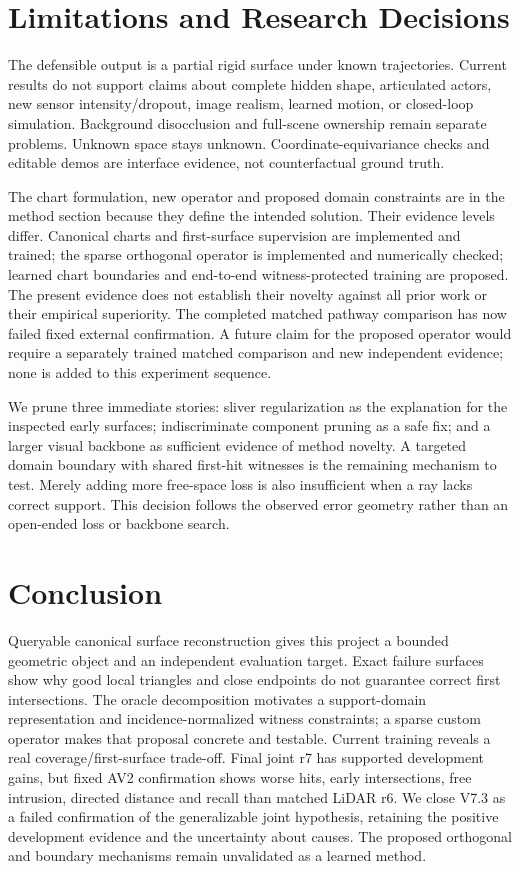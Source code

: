 \section{Limitations and Research Decisions}
\label{sec:limits}
The defensible output is a partial rigid surface under known trajectories. Current results do not support claims about complete hidden shape, articulated actors, new sensor intensity/dropout, image realism, learned motion, or closed-loop simulation. Background disocclusion and full-scene ownership remain separate problems. Unknown space stays unknown. Coordinate-equivariance checks and editable demos are interface evidence, not counterfactual ground truth.

The chart formulation, new operator and proposed domain constraints are in the method section because they define the intended solution. Their evidence levels differ. Canonical charts and first-surface supervision are implemented and trained; the sparse orthogonal operator is implemented and numerically checked; learned chart boundaries and end-to-end witness-protected training are proposed. The present evidence does not establish their novelty against all prior work or their empirical superiority. The completed matched pathway comparison has now failed fixed external confirmation. A future claim for the proposed operator would require a separately trained matched comparison and new independent evidence; none is added to this experiment sequence.

We prune three immediate stories: sliver regularization as the explanation for the inspected early surfaces; indiscriminate component pruning as a safe fix; and a larger visual backbone as sufficient evidence of method novelty. A targeted domain boundary with shared first-hit witnesses is the remaining mechanism to test. Merely adding more free-space loss is also insufficient when a ray lacks correct support. This decision follows the observed error geometry rather than an open-ended loss or backbone search.

\section{Conclusion}
Queryable canonical surface reconstruction gives this project a bounded geometric object and an independent evaluation target. Exact failure surfaces show why good local triangles and close endpoints do not guarantee correct first intersections. The oracle decomposition motivates a support-domain representation and incidence-normalized witness constraints; a sparse custom operator makes that proposal concrete and testable. Current training reveals a real coverage/first-surface trade-off. Final joint r7 has supported development gains, but fixed AV2 confirmation shows worse hits, early intersections, free intrusion, directed distance and recall than matched LiDAR r6. We close V7.3 as a failed confirmation of the generalizable joint hypothesis, retaining the positive development evidence and the uncertainty about causes. The proposed orthogonal and boundary mechanisms remain unvalidated as a learned method.
